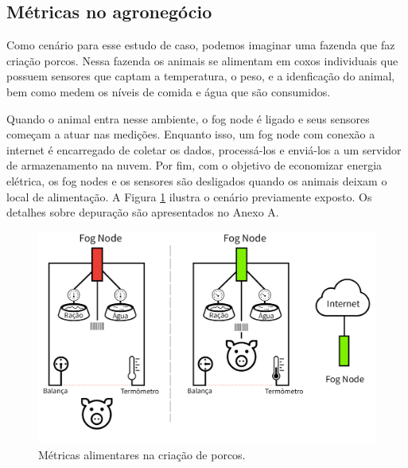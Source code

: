 \subsection{Métricas no agronegócio}


Como cenário para esse estudo de caso, podemos imaginar uma fazenda que faz criação porcos.
Nessa fazenda os animais se alimentam em coxos individuais que possuem sensores que captam a temperatura, o peso, e a idenficação do animal, bem como medem os níveis de comida e água
que são consumidos.

Quando o animal entra nesse ambiente, o fog node é ligado e seus sensores começam a atuar nas medições.
Enquanto isso, um fog node com conexão a internet é encarregado de coletar os dados, processá-los e enviá-los a um servidor de armazenamento na nuvem.
Por fim, com o objetivo de economizar energia elétrica, os fog nodes e os sensores são desligados quando os animais deixam o local de alimentação.
A Figura \ref{fig:fig17} ilustra o cenário previamente exposto. Os detalhes sobre depuração são apresentados no Anexo A.


\begin{figure}[H]
    \centering\includegraphics[width=.8\textwidth]{fig17.png} 
    \caption[ Métricas alimentares na criação de porcos]
    {\label{fig:fig17} Métricas alimentares na criação de porcos.}
\end{figure}
